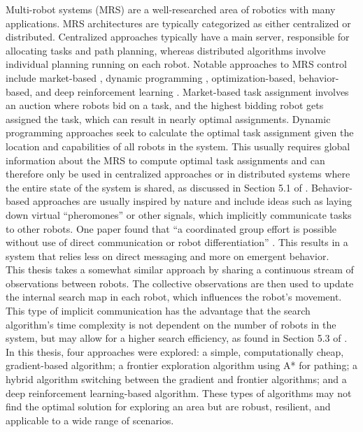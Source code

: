 Multi-robot systems (MRS) are a well-researched area of robotics with many applications. MRS architectures are typically categorized as either centralized or distributed. Centralized approaches typically have a main server, responsible for allocating tasks and path planning, whereas distributed algorithms involve individual planning running on each robot. Notable approaches to MRS control include market-based \cite{trigui2014market}, dynamic programming \cite{kato2011dp}, optimization-based, behavior-based, and deep reinforcement learning \cite{huttenrauch2019deep-swarm}. Market-based task assignment involves an auction where robots bid on a task, and the highest bidding robot gets assigned the task, which can result in nearly optimal assignments. Dynamic programming approaches seek to calculate the optimal task assignment given the location and capabilities of all robots in the system. This usually requires global information about the MRS to compute optimal task assignments and can therefore only be used in centralized approaches or in distributed systems where the entire state of the system is shared, as discussed in Section 5.1 of \cite{multi-robot-search-moving-target}. Behavior-based approaches are usually inspired by nature and include ideas such as laying down virtual “pheromones” or other signals, which implicitly communicate tasks to other robots. One paper found that “a coordinated group effort is possible without use of direct communication or robot differentiation” \cite{kube2000cooperative-ants}. This results in a system that relies less on direct messaging and more on emergent behavior. \\

This thesis takes a somewhat similar approach by sharing a continuous stream of observations between robots. The collective observations are then used to update the internal search map in each robot, which influences the robot's movement. This type of implicit communication has the advantage that the search algorithm's time complexity is not dependent on the number of robots in the system, but may allow for a higher search efficiency, as found in Section 5.3 of \cite{multi-robot-search-moving-target}. In this thesis, four approaches were explored: a simple, computationally cheap, gradient-based algorithm; a frontier exploration algorithm using A* for pathing; a hybrid algorithm switching between the gradient and frontier algorithms; and a deep reinforcement learning-based algorithm. These types of algorithms may not find the optimal solution for exploring an area but are robust, resilient, and applicable to a wide range of scenarios.
